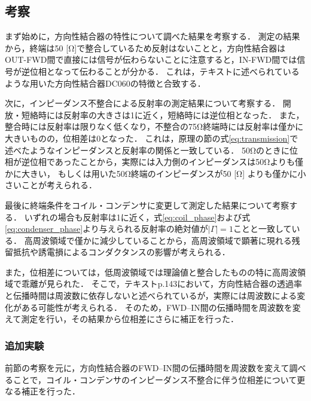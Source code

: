 \documentclass[uplatex,dvipdfmx,a4j,12pt]{jsarticle}
\begin{document}
\subsection{考察}
まず始めに，方向性結合器の特性について調べた結果を考察する．
測定の結果から，終端は50 [\si{\ohm}]で整合しているため反射はないことと，方向性結合器はOUT-FWD間で直接には信号が伝わらないことに注意すると，IN-FWD間では信号が逆位相となって伝わることが分かる．
これは，テキストに述べられているような用いた方向性結合器DC060の特徴と合致する．

次に，インピーダンス不整合による反射率の測定結果について考察する．
開放・短絡時には反射率の大きさは1に近く，短絡時には逆位相となった．
また，整合時には反射率は限りなく低くなり，不整合の75\si{\ohm}終端時には反射率は僅かに大きいものの，位相差は0となった．
これは，原理の節の式\ref{eq:transmission}で述べたようなインピーダンスと反射率の関係と一致している．
50\si{\ohm}のときに位相が逆位相であったことから，実際には入力側のインピーダンスは50\si{\ohm}よりも僅かに大きい，
もしくは用いた50\si{\ohm}終端のインピーダンスが50 [\si{\ohm}] よりも僅かに小さいことが考えられる．

最後に終端条件をコイル・コンデンサに変更して測定した結果について考察する．
いずれの場合も反射率は1に近く，式\ref{eq:coil_phase}および式\ref{eq:condenser_phase}より与えられる反射率の絶対値が$|\Gamma| = 1$ことと一致している．
高周波領域で僅かに減少していることから，高周波領域で顕著に現れる残留抵抗や誘電損によるコンダクタンスの影響が考えられる．

また，位相差については，低周波領域では理論値と整合したものの特に高周波領域で乖離が見られた．
そこで，テキストp.143において，方向性結合器の透過率と伝播時間は周波数に依存しないと述べられているが，実際には周波数による変化がある可能性が考えられる．
そのため，FWD--IN間の伝播時間を周波数を変えて測定を行い，その結果から位相差にさらに補正を行った．

\subsubsection{追加実験}
前節の考察を元に，方向性結合器のFWD--IN間の伝播時間を周波数を変えて調べることで，コイル・コンデンサのインピーダンス不整合に伴う位相差について更なる補正を行った．
\end{document}
